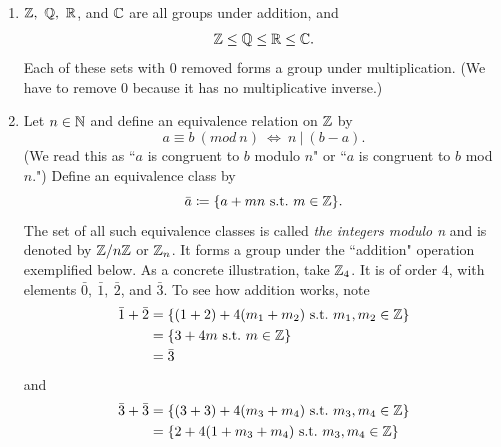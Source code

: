 \begin{example*}{}{}
\begin{enumerate}
  \item $\mathbb{Z},\ \mathbb{Q},\ \mathbb{R}$, and $\mathbb{C}$ are all groups
        under addition, and
        \begin{equation}
          \mathbb{Z} \leq \mathbb{Q} \leq \mathbb{R} \leq \mathbb{C}.
        \end{equation}
        Each of these sets with 0 removed forms a group under
        multiplication. (We have to remove 0 because it has no multiplicative
        inverse.)
  \item Let $n\in \mathbb{N}$ and define an equivalence relation on 
        $\mathbb{Z}$ by 
        \begin{equation}
          a\equiv b\ (mod\ n)\ \Leftrightarrow\ n\ |\ (b-a).
        \end{equation}
        (We read this as ``$a$ is congruent to $b$ modulo $ n$" or ``$a$ is
        congruent to $b$ mod $n$.") Define an equivalence class by 
        \begin{equation}
          \bar{a}\coloneqq\{a+mn ~\text{s.t.}~ m\in \mathbb{Z}\}.
        \end{equation}
        The set of all such equivalence classes is called {\it the integers 
        modulo n} and is denoted by 
        $\mathbb{Z}/n\mathbb{Z}$ or $\mathbb{Z}_n$. It forms a group 
        under the ``addition" operation exemplified below. As a concrete 
        illustration, take $\mathbb{Z}_4$. It is of order 4, with 
        elements $\bar{0},\ \bar{1},\ \bar{2}$, and $\bar{3}$. To see how 
        addition works, note
        \begin{equation}
          \label{eq:chgtmaad1}
          \begin{aligned}
            \bar{1}+\bar{2}&=\{(1+2)+4(m_{1}+m_{2}) ~\text{s.t.}~ m_{1},m_{2}
                             \in \mathbb{Z}\}\\
                         &=\{3+4m ~\text{s.t.}~ m\in \mathbb{Z}\}\\
                         &=\bar{3}
          \end{aligned}
        \end{equation}
        and
        \begin{equation}
          \label{eq:chgtmaad2}
          \begin{aligned}
            \bar{3}+\bar{3}&=\{(3+3)+4(m_{3}+m_{4})\suchthat m_{3},m_{4}
                             \in \Z\}\\
                         &=\{2+4(1+m_{3}+m_{4})\suchthat m_{3},m_{4}
                             \in \Z\}\\

\end{aligned}
\end{equation}
\end{enumerate}
\end{example*}
